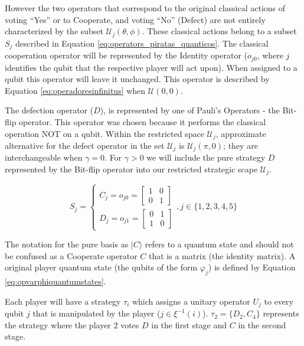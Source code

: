 \documentclass[10pt]{llncs}
\begin{document}
 However the two operators that correspond to the original classical actions of voting ``Yes'' or to Cooperate, and voting ``No'' (Defect) are not entirely characterized by the subset $\mathcal{U}_{j}(\theta, \phi)$. These classical actions belong to a subset $S_{j}$ described in Equation \eqref{eq:operators_piratas_quanticos}.  
The classical cooperation operator will be represented by the Identity operator ($o_{j0}$, where $j$ identifies the qubit that the respective player will act upon). When assigned to a qubit this operator will leave it unchanged. This operator is described by Equation \eqref{eq:operadoresinfinitus} when $\mathcal{U}(0,0)$.

The defection operator ($D$), is represented by one of Pauli's Operators - the Bit-flip operator. This operator was chosen because it performs the classical operation NOT on a qubit. 
Within the restricted space $\mathcal{U}_{j}$, approximate alternative for the defect operator in the set $\mathcal{U}_{j}$ is $\mathcal{U}_{j}(\pi, 0)$; they are interchangeable when $\gamma = 0$. For $\gamma >0$ we will include the pure strategy $D$ represented by the Bit-flip operator into our restricted strategic scape $\mathcal{U}_{j}$.



\begin{equation}
S_{j} = \begin{cases}
C_{j} = o_{j0}=\left[\begin{array}{cc}
1 & 0\\
0 & 1
\end{array}\right]\\
D_{j} = o_{j1}=\left[\begin{array}{cc}
0 & 1\\
1 & 0
\end{array}\right]
\end{cases} , j \in \{ 1, 2, 3, 4, 5 \}
\label{eq:operators_piratas_quanticos}
\end{equation}



The notation for the pure basis as $\vert C\rangle$ refers to a quantum state and should not be confused as a Cooperate operator $C$ that is a matrix (the identity matrix). A original player quantum state (the qubits of the form $\varphi_{j}$) is defined by Equation \eqref{eq:opvarphiquantumstates}.


Each player will have a strategy $\tau_{i}$  which assigns a
unitary operator $U_{j}$ to every qubit $j$ that is manipulated
by the player ($j$$\in\xi^{-1}(i)$). $\tau_{2}= \{D_{2},C_{4}\}$ represents the strategy where the player $2$ votes $D$ in the first stage and $C$ in the second stage.
\end{document}
